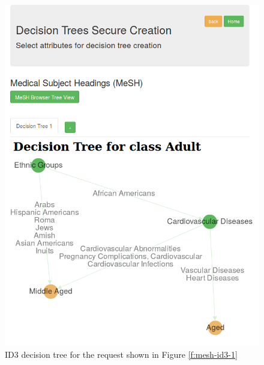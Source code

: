\begin{minipage}{0.47\textwidth}
  \begin{figure}[H]
  \includegraphics[width=\columnwidth]{figures/mesh_id3_2.png}
  \caption{ID3 decision tree for the request shown in Figure \ref{f:mesh-id3-1}}
  \label{f:mesh-id3-2}
\end{figure}
\end{minipage}



